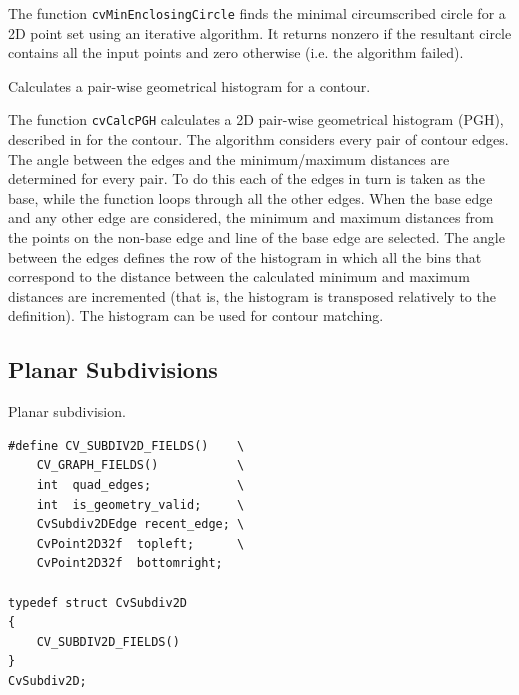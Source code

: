 The function \texttt{cvMinEnclosingCircle} finds the minimal circumscribed
circle for a 2D point set using an iterative algorithm. It returns nonzero
if the resultant circle contains all the input points and zero otherwise
(i.e. the algorithm failed).

\label{CalcPGH}

Calculates a pair-wise geometrical histogram for a contour.


\begin{description}
\end{description}

The function \texttt{cvCalcPGH} calculates a
2D pair-wise geometrical histogram (PGH), described in
for the contour. The algorithm considers every pair of contour
edges. The angle between the edges and the minimum/maximum distances
are determined for every pair. To do this each of the edges in turn
is taken as the base, while the function loops through all the other
edges. When the base edge and any other edge are considered, the minimum
and maximum distances from the points on the non-base edge and line of
the base edge are selected. The angle between the edges defines the row
of the histogram in which all the bins that correspond to the distance
between the calculated minimum and maximum distances are incremented
(that is, the histogram is transposed relatively to the 
definition). The histogram can be used for contour matching.

\subsection{Planar Subdivisions}

\label{CvSubdiv2D}

Planar subdivision.

\begin{lstlisting}
#define CV_SUBDIV2D_FIELDS()    \
    CV_GRAPH_FIELDS()           \
    int  quad_edges;            \
    int  is_geometry_valid;     \
    CvSubdiv2DEdge recent_edge; \
    CvPoint2D32f  topleft;      \
    CvPoint2D32f  bottomright;

typedef struct CvSubdiv2D
{
    CV_SUBDIV2D_FIELDS()
}
CvSubdiv2D;
\end{lstlisting}

